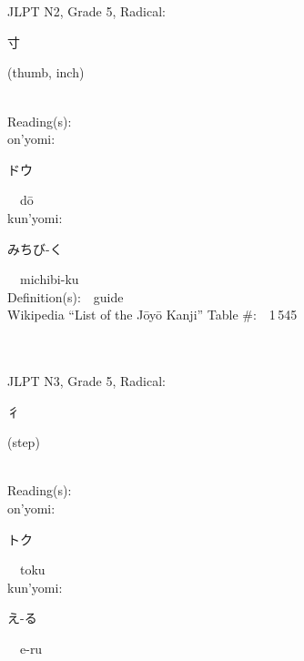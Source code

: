 \begin{multicols}{2}
\ \ \\
{\fontsize{34pt}{40pt}  }\ \ \\  %
{JLPT N2, Grade 5, Radical:\ \ {\begin{CJK}{UTF8}{min} 寸 \end{CJK}} (thumb, inch) } \\
Reading(s):\ \ \\
{\hspace*{1em}}on'yomi:\ \ \\
{\hspace*{2em}}{\begin{CJK}{UTF8}{min} ドウ \end{CJK}}\ \ d\=o\ \ \\
{\hspace*{1em}}kun'yomi:\ \ \\
{\hspace*{2em}}{\begin{CJK}{UTF8}{min} みちび-く \end{CJK}}\ \ michibi-ku\ \ \\
Definition(s):\ \ guide \\
Wikipedia ``List of the J\=oy\=o Kanji'' Table \#:\ \ 1\,545 \\
\ \ \\
{\fontsize{34pt}{40pt}  }\ \ \\  %
{JLPT N3, Grade 5, Radical:\ \ {\begin{CJK}{UTF8}{min} 彳 \end{CJK}} (step) } \\
Reading(s):\ \ \\
{\hspace*{1em}}on'yomi:\ \ \\
{\hspace*{2em}}{\begin{CJK}{UTF8}{min} トク \end{CJK}}\ \ toku\ \ \\
{\hspace*{1em}}kun'yomi:\ \ \\
{\hspace*{2em}}{\begin{CJK}{UTF8}{min} え-る \end{CJK}}\ \ e-ru\ \ \\

\end{multicols}
